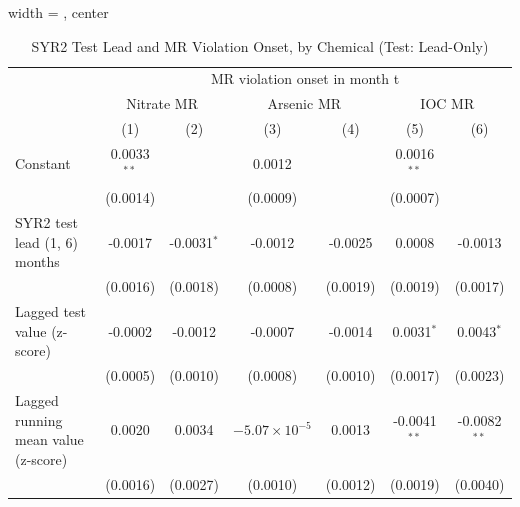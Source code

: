 
\begin{table}[htbp]
   
   \caption{\label{tab:syr2_test_mr_violation_bychem_leadonly_test} SYR2 Test Lead and MR Violation Onset, by Chemical (Test: Lead-Only)}
   \bigskip
   
   \centering
   
   \begin{adjustbox}{width = \textwidth, center}
      
      
      \begin{tabular}{lcccccc}
         \toprule
         
          & \multicolumn{6}{c}{MR violation onset in month t}\\
         
          & \multicolumn{2}{c}{Nitrate MR} & \multicolumn{2}{c}{Arsenic MR} & \multicolumn{2}{c}{IOC MR} \\ 
         
                                                & (1)           & (2)           & (3)                    & (4)           & (5)            & (6)\\  
         
         \midrule 
         Constant                               & 0.0033$^{**}$ &               & 0.0012                 &               & 0.0016$^{**}$  &   \\   
                                                & (0.0014)      &               & (0.0009)               &               & (0.0007)       &   \\   
         SYR2 test lead (1, 6) months           & -0.0017       & -0.0031$^{*}$ & -0.0012                & -0.0025       & 0.0008         & -0.0013\\   
                                                & (0.0016)      & (0.0018)      & (0.0008)               & (0.0019)      & (0.0019)       & (0.0017)\\   
         Lagged test value (z-score)            & -0.0002       & -0.0012       & -0.0007                & -0.0014       & 0.0031$^{*}$   & 0.0043$^{*}$\\   
                                                & (0.0005)      & (0.0010)      & (0.0008)               & (0.0010)      & (0.0017)       & (0.0023)\\   
         Lagged running mean value (z-score)    & 0.0020        & 0.0034        & $-5.07\times 10^{-5}$  & 0.0013        & -0.0041$^{**}$ & -0.0082$^{**}$\\   
                                                & (0.0016)      & (0.0027)      & (0.0010)               & (0.0012)      & (0.0019)       & (0.0040)\\   
         

\end{tabular}
\end{adjustbox}
\end{table}
